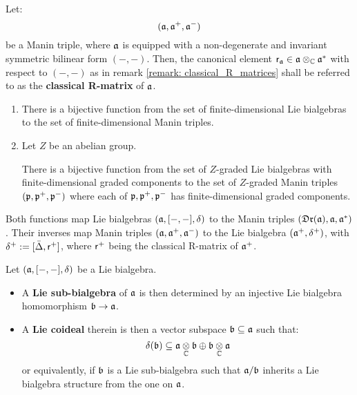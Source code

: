         \begin{definition} \label{def: classical_R_matrices}
            Let:
                $$(\mathfrak{a}, \mathfrak{a}^+, \mathfrak{a}^-)$$
            be a Manin triple, where $\mathfrak{a}$ is equipped with a non-degenerate and invariant symmetric bilinear form $(-, -)$. Then, the canonical element $\sfr_{\a} \in \a \tensor_{\bbC} \a^*$ with respect to $(-, -)$ as in remark \ref{remark: classical_R_matrices} shall be referred to as the \textbf{classical R-matrix} of $\mathfrak{a}$.
        \end{definition}
        \begin{lemma} \label{lemma: lie_bialgebras_from_manin_triples}
            \begin{enumerate}
                \item \cite[Proposition 1.3.4 and Lemma 1.3.5]{chari_pressley_quantum_groups} There is a bijective function from the set of finite-dimensional Lie bialgebras to the set of finite-dimensional Manin triples.
                \item Let $Z$ be an abelian group. 

                There is a bijective function from the set of $Z$-graded Lie bialgebras with finite-dimensional graded components to the set of $Z$-graded Manin triples $(\mathfrak{p}, \mathfrak{p}^+, \mathfrak{p}^-)$ where each of $\mathfrak{p}, \mathfrak{p}^+, \mathfrak{p}^-$ has finite-dimensional graded components.
            \end{enumerate}
            Both functions map Lie bialgebras $(\mathfrak{a}, [-, -], \delta)$ to the Manin triples $(\mathfrak{Dr}(\mathfrak{a}), \mathfrak{a}, \mathfrak{a}^*)$. Their inverses map Manin triples $(\mathfrak{a}, \mathfrak{a}^+, \mathfrak{a}^-)$ to the Lie bialgebra $(\mathfrak{a}^+, \delta^+)$, with $\delta^+ := [\bar{\Delta}, \mathsf{r}^+]$, where $\mathsf{r}^+$ being the classical R-matrix of $\mathfrak{a}^+$.
        \end{lemma}
        \begin{definition} \label{def: lie_sub_bialgebras_and_lie_coideals}
            Let $(\mathfrak{a}, [-, -], \delta)$ be a Lie bialgebra.
            \begin{itemize}
                \item A \textbf{Lie sub-bialgebra} of $\mathfrak{a}$ is then determined by an injective Lie bialgebra homomorphism $\mathfrak{b} \to \mathfrak{a}$. 
                \item A \textbf{Lie coideal} therein is then a vector subspace $\mathfrak{b} \subseteq \mathfrak{a}$ such that:
                    $$\delta(\b) \subseteq \a \tensor_{\bbC} \b \oplus \b \tensor_{\bbC} \a$$
                or equivalently, if $\mathfrak{b}$ is a Lie sub-bialgebra such that $\mathfrak{a}/\mathfrak{b}$ inherits a Lie bialgebra structure from the one on $\mathfrak{a}$.
            \end{itemize}
        \end{definition}
